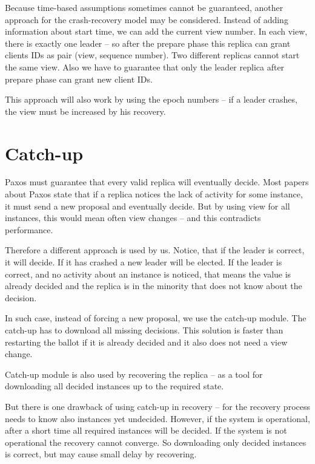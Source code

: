 Because time-based assumptions sometimes cannot be guaranteed, another approach for the crash-recovery model may be considered. Instead of adding information about start time, we can add the current view number. In each view, there is exactly one leader -- so after the prepare phase this replica can grant clients IDs as pair (view, sequence number). Two different replicas cannot start the same view.
Also we have to guarantee that only the leader replica after prepare phase can grant new client IDs.

This approach will also work by using the epoch numbers -- if a leader crashes, the view must be increased by his recovery. %


\section{Catch-up}
\label{sec:catch_up}

Paxos must guarantee that every valid replica will eventually decide. Most papers about Paxos state that if a replica notices the lack of activity for some instance, it must send a new proposal and eventually decide. But by using view for all instances, this would mean often view changes -- and this contradicts performance.

Therefore a different approach is used by us. Notice, that if the leader is correct, it will decide. If it has crashed a new leader will be elected. If the leader is correct, and no activity about an instance is noticed, that means the value is already decided and the replica is in the minority that does not know about the decision.

In such case, instead of forcing a new proposal, we use the catch-up module.
The catch-up has to download all missing decisions. This solution is faster than restarting the ballot if it is already decided and it also does not need a view change.


Catch-up module is also used by recovering the replica -- as a tool for downloading all decided instances up to the required state.

But there is one drawback of using catch-up in recovery -- for the recovery process needs to know also instances yet undecided.  However, if the system is operational, after a short time all required instances will be decided. If the system is not operational the recovery cannot converge. So downloading only decided instances is correct, but may cause small delay by recovering.

